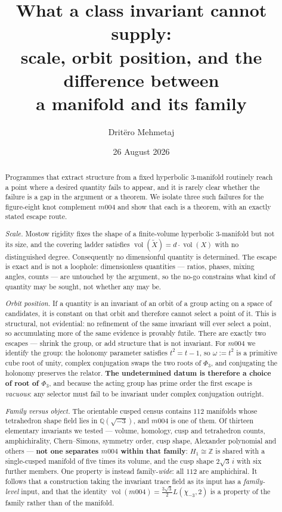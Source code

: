 \documentclass[11pt,a4paper]{article}
\title{What a class invariant cannot supply:\\
scale, orbit position, and the difference between\\
a manifold and its family}
\author{Drit\"ero Mehmetaj}
\date{26 August 2026}
\theoremstyle{definition}
\theoremstyle{remark}
\newcommand{\Z}{\mathbb{Z}}
\newcommand{\Q}{\mathbb{Q}}
\newcommand{\vol}{\operatorname{vol}}
\begin{document}
\maketitle

\begin{abstract}
Programmes that extract structure from a fixed hyperbolic $3$-manifold routinely reach a point
where a desired quantity fails to appear, and it is rarely clear whether the failure is a gap in
the argument or a theorem. We isolate three such failures for the figure-eight knot complement
$m004$ and show that each is a theorem, with an exactly stated escape route.

\emph{Scale.} Mostow rigidity fixes the shape of a finite-volume hyperbolic $3$-manifold but not
its size, and the covering ladder satisfies $\vol(\widetilde X)=d\cdot\vol(X)$ with no
distinguished degree. Consequently no dimensionful quantity is determined. The escape is exact
and is not a loophole: dimensionless quantities --- ratios, phases, mixing angles, counts --- are
untouched by the argument, so the no-go constrains what kind of quantity may be sought, not
whether any may be.

\emph{Orbit position.} If a quantity is an invariant of an orbit of a group acting on a space of
candidates, it is constant on that orbit and therefore cannot select a point of it. This is
structural, not evidential: no refinement of the same invariant will ever select a point, so
accumulating more of the same evidence is provably futile. There are exactly two escapes ---
shrink the group, or add structure that is not invariant. For $m004$ we identify the group: the
holonomy parameter satisfies $t^2=t-1$, so $\omega:=t^2$ is a primitive cube root of unity,
complex conjugation swaps the two roots of $\Phi_3$, and conjugating the holonomy preserves the
relator. \textbf{The undetermined datum is therefore a choice of root of $\Phi_3$}, and because the
acting group has prime order the first escape is \emph{vacuous}: any selector must fail to be
invariant under complex conjugation outright.

\emph{Family versus object.} The orientable cusped census contains $112$ manifolds whose
tetrahedron shape field lies in $\Q(\sqrt{-3})$, and $m004$ is one of them. Of thirteen elementary
invariants we tested --- volume, homology, cusp and tetrahedron counts, amphichirality,
Chern--Simons, symmetry order, cusp shape, Alexander polynomial and others --- \textbf{not one
separates $m004$ within that family}: $H_1\cong\Z$ is shared with a single-cusped manifold of five
times its volume, and the cusp shape $2\sqrt3\,i$ with six further members. One property is instead
family-\emph{wide}: all $112$ are amphichiral. It follows that a construction taking the invariant
trace field as its input has a \emph{family-level} input, and that the identity
$\vol(m004)=\tfrac{3\sqrt3}{2}L(\chi_{-3},2)$ is a property of the family rather than of the
manifold.


\end{abstract}
\end{document}
